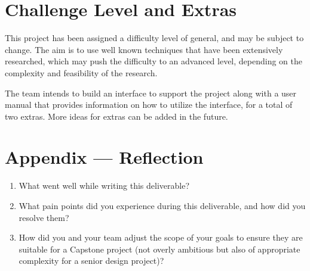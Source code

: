\documentclass{article}
\begin{document}
\section{Challenge Level and Extras}
This project has been assigned a difficulty level of general, and may be subject to change. The aim is to use well known techniques that have been extensively researched, which may push the difficulty to an advanced level, depending on the complexity and feasibility of the research. 


The team intends to build an interface to support the project along with a user manual that provides information on how to utilize the interface, for a total of two extras. More ideas for extras can be added in the future.



\newpage{}

\section*{Appendix --- Reflection}




\begin{enumerate}
    \item What went well while writing this deliverable? 
    \item What pain points did you experience during this deliverable, and how
    did you resolve them?
    \item How did you and your team adjust the scope of your goals to ensure
    they are suitable for a Capstone project (not overly ambitious but also of
    appropriate complexity for a senior design project)?
\end{enumerate}  
\end{document}
